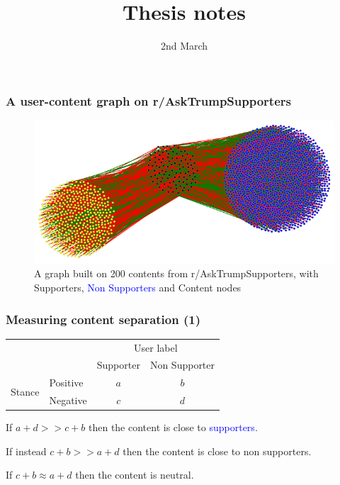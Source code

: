 \documentclass{beamer}
\begin{document}
\title{Thesis notes}
\date{2nd March}
\frame{\titlepage}

\begin{frame}[c]
    \frametitle{A user-content graph on r/AskTrumpSupporters}
    \begin{figure}[htpb]
        \centering
        \includegraphics[width=0.8\linewidth]{img/experimental-graph.png}
        \caption{A graph built on 200 contents from r/AskTrumpSupporters, with
        \textcolor{myyellow}{Supporters}, \textcolor{blue}{Non
    Supporters} and Content nodes}%
        \label{fig:img/experimental-graph}
    \end{figure}
\end{frame}

\begin{frame}[c]
    \frametitle{Measuring content separation (1)}
    \begin{tabular}{l|l|c|c|}
        \multicolumn{2}{c}{}&\multicolumn{2}{c}{User label}\\
        \cline{3-4}
        \multicolumn{2}{c|}{}&Supporter&Non Supporter\\
        \cline{2-4}
        \multirow{2}{*}{Stance}& Positive & $a$ & $b$ \\
        \cline{2-4}
                                       & Negative & $c$ & $d$ \\
                                       \cline{2-4}
    \end{tabular} 

    \bigskip

    If $a + d >> c + b$ then the content is close to \textcolor{blue}{supporters}.

    \bigskip

    If instead $c + b >> a + d$ then the content is close to
    \textcolor{myyellow}{non supporters}.

    \bigskip

    If $c + b \approx a + d$ then the content is neutral.
\end{frame}
\end{document}
